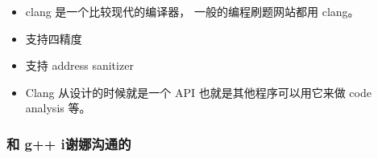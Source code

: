 
\begin{issues}
\issueDraft
\end{issues}

\begin{itemize}
\item clang 是一个比较现代的编译器， 一般的编程刷题网站都用 clang。
\item 支持四精度
\item 支持 address sanitizer
\item Clang 从设计的时候就是一个 API 也就是其他程序可以用它来做 code analysis 等。
\end{itemize}

\subsubsection{和 g++ i谢娜沟通的}